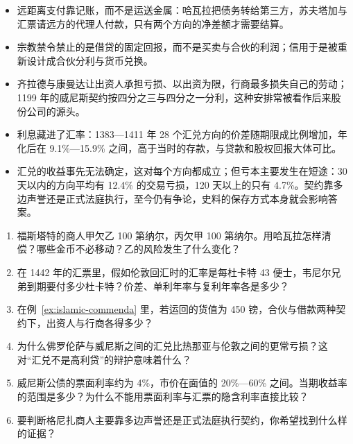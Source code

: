 \begin{takeaways}
\begin{itemize}
\item 远距离支付靠记账，而不是运送金属：哈瓦拉把债务转给第三方，苏夫塔加与汇票请远方的代理人付款，只有两个方向的净差额才需要结算。
\item 宗教禁令禁止的是借贷的固定回报，而不是买卖与合伙的利润；信用于是被重新设计成合伙分利与货币兑换。
\item 齐拉德与康曼达让出资人承担亏损、以出资为限，行商最多损失自己的劳动；1199 年的威尼斯契约按四分之三与四分之一分利，这种安排常被看作后来股份公司的源头。
\item 利息藏进了汇率：1383—1411 年 28 个汇兑方向的价差随期限成比例增加，年化后在 9.1\%—15.9\% 之间，高于当时的存款，与贷款和股权回报大体可比。
\item 汇兑的收益事先无法确定，这对每个方向都成立；但亏本主要发生在短途：30 天以内的方向平均有 12.4\% 的交易亏损，120 天以上的只有 4.7\%。契约靠多边声誉还是正式法庭执行，至今仍有争论，史料的保存方式本身就会影响答案。
\end{itemize}
\end{takeaways}

\begin{selfcheck}
\begin{enumerate}
\item 福斯塔特的商人甲欠乙 100 第纳尔，丙欠甲 100 第纳尔。用哈瓦拉怎样清偿？哪些金币不必移动？乙的风险发生了什么变化？
\item 在 1442 年的汇票里，假如伦敦回汇时的汇率是每杜卡特 43 便士，韦尼尔兄弟到期要付多少杜卡特？价差、单利年率与复利年率各是多少？
\item 在例~\ref{ex:islamic-commenda} 里，若运回的货值为 450 镑，合伙与借款两种契约下，出资人与行商各得多少？
\item 为什么佛罗伦萨与威尼斯之间的汇兑比热那亚与伦敦之间的更常亏损？这对“汇兑不是高利贷”的辩护意味着什么？
\item 威尼斯公债的票面利率约为 4\%，市价在面值的 20\%—60\% 之间。当期收益率的范围是多少？为什么不能用票面利率与汇票的隐含利率直接比较？
\item 要判断格尼扎商人主要靠多边声誉还是正式法庭执行契约，你希望找到什么样的证据？
\end{enumerate}
\end{selfcheck}

